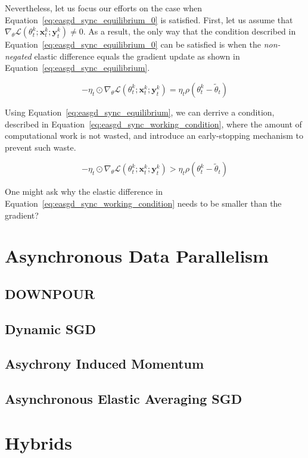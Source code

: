 Nevertheless, let us focus our efforts on the case when Equation~\ref{eq:easgd_sync_equilibrium_0} is satisfied. First, let us assume that $\nabla_\theta \mathcal{L}(\theta^k_t;\mathbf{x}^k_t;\mathbf{y}^k_t) \neq 0$. As a result, the only way that the condition described in Equation~\ref{eq:easgd_sync_equilibrium_0} can be satisfied is when the \emph{non-negated} elastic difference equals the gradient update as shown in Equation~\ref{eq:easgd_sync_equilibrium}.

\begin{equation}
  \label{eq:easgd_sync_equilibrium}
  -\eta_t \odot \nabla_\theta \mathcal{L}(\theta^k_t;\mathbf{x}^k_t;\mathbf{y}^k_t) = \eta_t\rho(\theta^k_t - \tilde{\theta}_t)
\end{equation}

Using Equation~\ref{eq:easgd_sync_equilibrium}, we can derrive a condition, described in Equation~\ref{eq:easgd_sync_working_condition}, where the amount of computational work is not wasted, and introduce an early-stopping mechanism to prevent such waste.

\begin{equation}
  \label{eq:easgd_sync_working_condition}
  -\eta_t \odot \nabla_\theta \mathcal{L}(\theta^k_t;\mathbf{x}^k_t;\mathbf{y}^k_t) > \eta_t\rho(\theta^k_t - \tilde{\theta}_t)
\end{equation}

One might ask why the elastic difference in Equation~\ref{eq:easgd_sync_working_condition} needs to be smaller than the gradient?

\section{Asynchronous Data Parallelism}
\label{sec:asynchronous_data_parallelism}

\subsection{DOWNPOUR}
\label{sec:downpour}

\subsection{Dynamic SGD}
\label{sec:dyn_sgd}

\subsection{Asychrony Induced Momentum}
\label{sec:implicit_momentum}

\subsection{Asynchronous Elastic Averaging SGD}
\label{sec:aeasgd}

\section{Hybrids}
\label{sec:hybrids}
